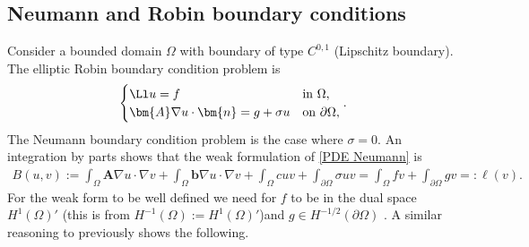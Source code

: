 \documentclass[
    a4paper,
    DIV=14,
    abstract=true,
    numbers=noenddot
]{scrartcl}
\begin{document}
\subsection{Neumann and Robin boundary conditions}
Consider a bounded domain $\Omega $ with boundary of type $C^{0,1}$ (Lipschitz boundary).   The elliptic Robin boundary condition problem is
\begin{align}\label{PDE Neumann}
    \begin{cases}
        \Ll u =f                                   & \text{in } \Omega ,          \\
        \bm{A} \nabla u \cdot \bm{n} =g + \sigma u & \text{on } \partial \Omega ,
    \end{cases}.
\end{align}
The Neumann boundary condition problem is the case where $\sigma =0$.
An integration by parts shows that the weak formulation of \eqref{PDE Neumann} is
\begin{align}\label{weak def Neumann}
    B(u,v):= \int_{\Omega } \bm{A} \nabla u \cdot \nabla v +\int_{\Omega } \bm{b} \nabla u \cdot \nabla v +\int_{\Omega } c u v+ \int_{\partial \Omega } \sigma u v  =\int_{\Omega } f v +\int_{\partial \Omega } g v=: \ell (v).
\end{align}
For the weak form to be well defined we need for $f$ to be in the dual space $H^1(\Omega )'$ (this is  from $H^{-1}(\Omega ):= H^1(\Omega )'$)and $g \in H^{-1/2}(\partial \Omega )$ . A similar reasoning to previously shows the following. 
\end{document}
